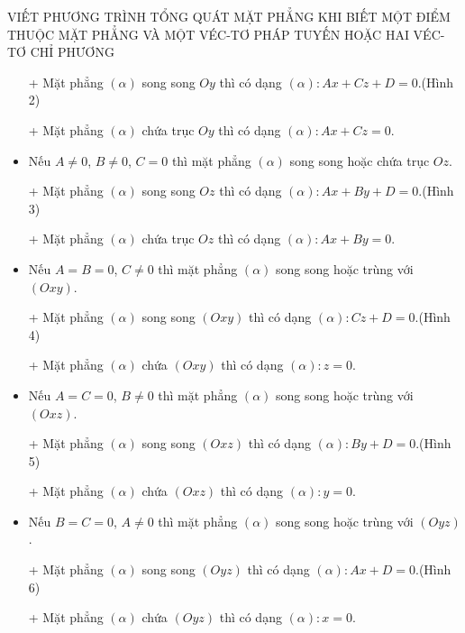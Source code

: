 \begin{dang}{VIẾT PHƯƠNG TRÌNH TỔNG QUÁT MẶT PHẲNG KHI BIẾT MỘT ĐIỂM THUỘC MẶT PHẲNG VÀ MỘT VÉC-TƠ PHÁP TUYẾN HOẶC HAI VÉC-TƠ CHỈ PHƯƠNG}
\begin{enumerate}[a.]
\begin{itemize}
\item[+] Mặt phẳng $\left(\alpha\right)$ song song $Oy$ thì có dạng $\left(\alpha\right) \colon Ax+Cz+D=0$.(Hình 2)
\item[+] Mặt phẳng $\left(\alpha\right)$ chứa trục $Oy$ thì có dạng $\left(\alpha\right) \colon Ax+Cz=0$.
\item Nếu $A\neq 0$, $B \neq 0$, $C = 0$ thì mặt phẳng $\left(\alpha\right)$ song song hoặc chứa trục $Oz$.
\item[+] Mặt phẳng $\left(\alpha\right)$ song song $Oz$ thì có dạng $\left(\alpha\right) \colon Ax+By+D=0$.(Hình 3)
\item[+] Mặt phẳng $\left(\alpha\right)$ chứa trục $Oz$ thì có dạng $\left(\alpha\right) \colon Ax+By=0$.
\item Nếu $A=B= 0$, $C \neq 0$ thì mặt phẳng $\left(\alpha\right)$ song song hoặc trùng với $\left(Oxy\right)$.
\item[+] Mặt phẳng $\left(\alpha\right)$ song song $\left(Oxy\right)$ thì có dạng $\left(\alpha\right) \colon Cz+D=0$.(Hình 4)
\item[+] Mặt phẳng $\left(\alpha\right)$ chứa $\left(Oxy\right)$ thì có dạng $\left(\alpha\right) \colon z=0$.
\item Nếu $A=C= 0$, $B \neq 0$ thì mặt phẳng $\left(\alpha\right)$ song song hoặc trùng với $\left(Oxz\right)$.
\item[+] Mặt phẳng $\left(\alpha\right)$ song song $\left(Oxz\right)$ thì có dạng $\left(\alpha\right) \colon By+D=0$.(Hình 5)
\item[+] Mặt phẳng $\left(\alpha\right)$ chứa $\left(Oxz\right)$ thì có dạng $\left(\alpha\right) \colon y=0$.
\item Nếu $B=C= 0$, $A \neq 0$ thì mặt phẳng $\left(\alpha\right)$ song song hoặc trùng với $\left(Oyz\right)$.
\item[+] Mặt phẳng $\left(\alpha\right)$ song song $\left(Oyz\right)$ thì có dạng $\left(\alpha\right) \colon Ax+D=0$.(Hình 6)
\item[+] Mặt phẳng $\left(\alpha\right)$ chứa $\left(Oyz\right)$ thì có dạng $\left(\alpha\right) \colon x=0$.
\end{itemize}


\end{enumerate}
\end{dang}
